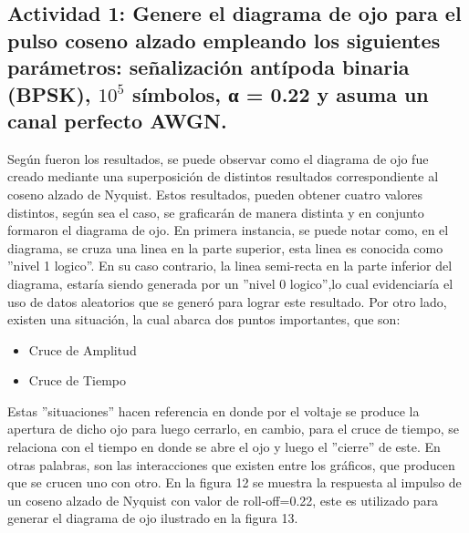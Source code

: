 \documentclass[lettersize,journal]{IEEEtran}
\begin{document}
\subsection{Actividad 1: Genere el diagrama de ojo para el pulso coseno alzado empleando los siguientes parámetros: señalización antípoda binaria (BPSK), $10^5$ símbolos, α = 0.22 y
asuma un canal perfecto AWGN.}
\newline \newline
Según fueron los resultados, se puede observar como el diagrama de ojo fue creado mediante una superposición de distintos resultados correspondiente al coseno alzado de Nyquist. Estos resultados, pueden obtener cuatro valores distintos, según sea el caso, se graficarán de manera distinta y en conjunto formaron el diagrama de ojo.
\newline \newline
En primera instancia, se puede notar como, en el diagrama, se cruza una linea en la parte superior, esta linea es conocida como ''nivel 1 logico''. En su caso contrario, la linea semi-recta en la parte inferior del diagrama, estaría siendo generada por un ''nivel 0 logico'',lo cual evidenciaría el uso de datos aleatorios que se generó para lograr este resultado.
\newline \newline
Por otro lado, existen una situación, la cual abarca dos puntos importantes, que son:
\begin{itemize}
    \item Cruce de Amplitud
    \item Cruce de Tiempo
\end{itemize}
\newline
Estas ''situaciones'' hacen referencia en donde por el voltaje se produce la apertura de dicho ojo para luego cerrarlo, en cambio, para el cruce de tiempo, se relaciona con el tiempo en donde se abre el ojo y luego el ''cierre'' de este. En otras palabras, son las interacciones que existen entre los gráficos, que producen que se crucen uno con otro.
\newline
En la figura 12 se muestra la respuesta al impulso de un coseno alzado de Nyquist con valor de roll-off=0.22, este es utilizado para generar el diagrama de ojo ilustrado en la figura 13.\\
\end{document}
